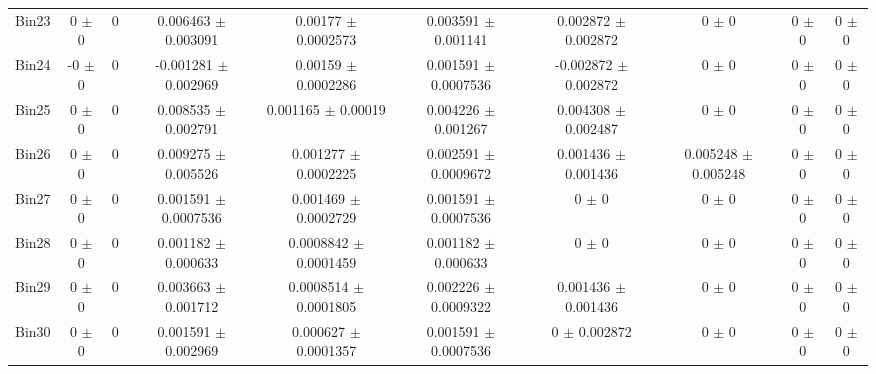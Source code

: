 \begin{tabular}{@{\extracolsep{4pt}}lccccccccc@{}}
     Bin23 & 0 $\pm$ 0 & 0 & 0.006463 $\pm$ 0.003091 & 0.00177 $\pm$ 0.0002573 & 0.003591 $\pm$ 0.001141 & 0.002872 $\pm$ 0.002872 & 0 $\pm$ 0 & 0 $\pm$ 0 & 0 $\pm$ 0 \\ 
     Bin24 & -0 $\pm$ 0 & 0 & -0.001281 $\pm$ 0.002969 & 0.00159 $\pm$ 0.0002286 & 0.001591 $\pm$ 0.0007536 & -0.002872 $\pm$ 0.002872 & 0 $\pm$ 0 & 0 $\pm$ 0 & 0 $\pm$ 0 \\ 
     Bin25 & 0 $\pm$ 0 & 0 & 0.008535 $\pm$ 0.002791 & 0.001165 $\pm$ 0.00019 & 0.004226 $\pm$ 0.001267 & 0.004308 $\pm$ 0.002487 & 0 $\pm$ 0 & 0 $\pm$ 0 & 0 $\pm$ 0 \\ 
     Bin26 & 0 $\pm$ 0 & 0 & 0.009275 $\pm$ 0.005526 & 0.001277 $\pm$ 0.0002225 & 0.002591 $\pm$ 0.0009672 & 0.001436 $\pm$ 0.001436 & 0.005248 $\pm$ 0.005248 & 0 $\pm$ 0 & 0 $\pm$ 0 \\ 
     Bin27 & 0 $\pm$ 0 & 0 & 0.001591 $\pm$ 0.0007536 & 0.001469 $\pm$ 0.0002729 & 0.001591 $\pm$ 0.0007536 & 0 $\pm$ 0 & 0 $\pm$ 0 & 0 $\pm$ 0 & 0 $\pm$ 0 \\ 
     Bin28 & 0 $\pm$ 0 & 0 & 0.001182 $\pm$ 0.000633 & 0.0008842 $\pm$ 0.0001459 & 0.001182 $\pm$ 0.000633 & 0 $\pm$ 0 & 0 $\pm$ 0 & 0 $\pm$ 0 & 0 $\pm$ 0 \\ 
     Bin29 & 0 $\pm$ 0 & 0 & 0.003663 $\pm$ 0.001712 & 0.0008514 $\pm$ 0.0001805 & 0.002226 $\pm$ 0.0009322 & 0.001436 $\pm$ 0.001436 & 0 $\pm$ 0 & 0 $\pm$ 0 & 0 $\pm$ 0 \\ 
     Bin30 & 0 $\pm$ 0 & 0 & 0.001591 $\pm$ 0.002969 & 0.000627 $\pm$ 0.0001357 & 0.001591 $\pm$ 0.0007536 & 0 $\pm$ 0.002872 & 0 $\pm$ 0 & 0 $\pm$ 0 & 0 $\pm$ 0 \\ 
\hline\hline
  \end{tabular}
